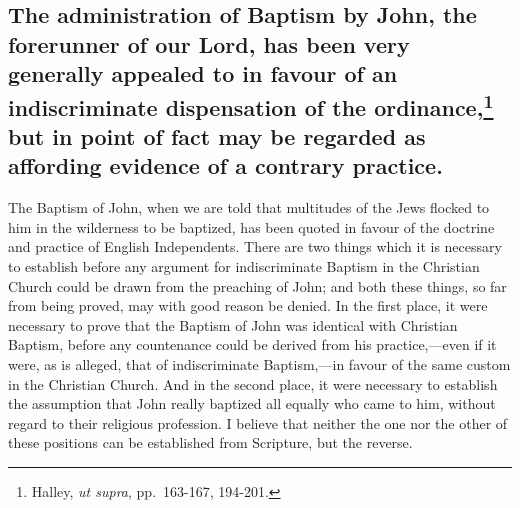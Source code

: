 \documentclass[english,]{book}
\begin{document}
\hypertarget{the-administration-of-baptism-by-john-the-forerunner-of-our-lord-has-been-very-generally-appealed-to-in-favour-of-an-indiscriminate-dispensation-of-the-ordinance21-but-in-point-of-fact-may-be-regarded-as-affording-evidence-of-a-contrary-practice.}{%
\subsection[The administration of Baptism by John, the forerunner of our Lord, has been very generally appealed to in favour of an indiscriminate dispensation of the ordinance, but in point of fact may be regarded as affording evidence of a contrary practice.]{\texorpdfstring{The administration of Baptism by John, the forerunner of our Lord, has been very generally appealed to in favour of an indiscriminate dispensation of the ordinance,\footnote{Halley, \emph{ut supra}, pp.~163-167, 194-201.} but in point of fact may be regarded as affording evidence of a contrary practice.}{The administration of Baptism by John, the forerunner of our Lord, has been very generally appealed to in favour of an indiscriminate dispensation of the ordinance, but in point of fact may be regarded as affording evidence of a contrary practice.}}\label{the-administration-of-baptism-by-john-the-forerunner-of-our-lord-has-been-very-generally-appealed-to-in-favour-of-an-indiscriminate-dispensation-of-the-ordinance21-but-in-point-of-fact-may-be-regarded-as-affording-evidence-of-a-contrary-practice.}}

The Baptism of John, when we are told that multitudes of the Jews flocked to him in the wilderness to be baptized, has been quoted in favour of the doctrine and practice of English Independents. There are two things which it is necessary to establish before any argument for indiscriminate Baptism in the Christian Church could be drawn from the preaching of John; and both these things, so far from being proved, may with good reason be denied. In the first place, it were necessary to prove that the Baptism of John was identical with Christian Baptism, before any countenance could be derived from his practice,---even if it were, as is alleged, that of indiscriminate Baptism,---in favour of the same custom in the Christian Church. And in the second place, it were necessary to establish the assumption that John really baptized all equally who came to him, without regard to their religious profession. I believe that neither the one nor the other of these positions can be established from Scripture, but the reverse.
\end{document}

